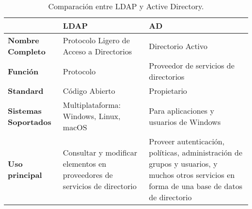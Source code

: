 \begin{table}[H]
	\centering
	\begin{tabular}{ |p{4cm}||p{4cm}|p{4cm}| }
		\hline
		 &\textbf{LDAP}&\textbf{AD}\\
		\hline
		\textbf{Nombre Completo }  &  Protocolo Ligero de Acceso a Directorios  &Directorio Activo\\
		\hline
		\textbf{Función}& Protocolo&Proveedor de servicios de directorios\\
		\hline
		\textbf{Standard} &Código Abierto & Propietario\\
		\hline
		\textbf{Sistemas Soportados}&Multiplataforma: Windows, Linux, macOS & Para aplicaciones y usuarios de Windows\\
		\hline
		\textbf{Uso principal}&   Consultar y modificar elementos en proveedores de servicios de directorio & Proveer autenticación, políticas, administración de grupos y usuarios, y muchos otros servicios en forma de una base de datos de directorio\\
		\hline
	\end{tabular}
	\caption{\label{tab:table-name}Comparación entre LDAP y Active Directory.}
\end{table}